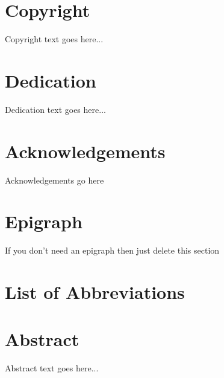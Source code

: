 \chapter*{Copyright}
Copyright text goes here...

\chapter*{Dedication}
Dedication text goes here...

\chapter*{Acknowledgements}

Acknowledgements go here

\chapter*{Epigraph}

If you don't need an epigraph then just delete this section



\chapter*{} %

\tableofcontents


\chapter*{} %
\listoffigures


\chapter*{} %
\listoftables

\chapter*{List of Abbreviations}

\chapter*{Abstract}
Abstract text goes here...

